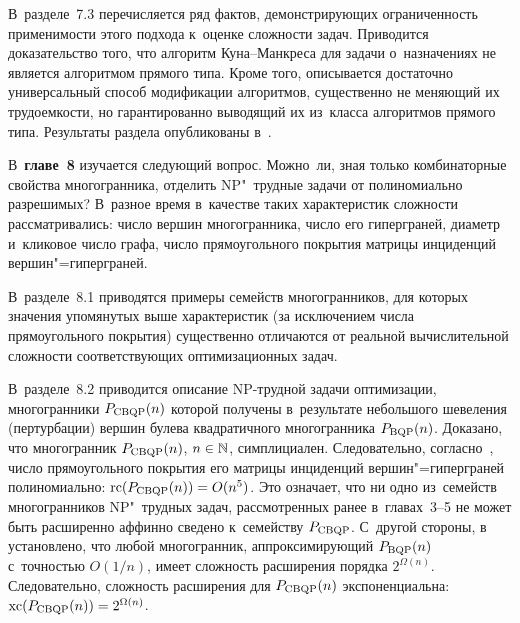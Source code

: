 В~разделе~7.3 перечисляется ряд фактов, демонстрирующих ограниченность применимости этого подхода к~оценке сложности задач.
Приводится доказательство того, что алгоритм Куна--Манкреса для задачи о~назначениях не является алгоритмом прямого типа.
Кроме того, описывается достаточно универсальный способ модификации алгоритмов,
существенно не меняющий их трудоемкости, но гарантированно выводящий их из~класса алгоритмов прямого типа. Результаты раздела опубликованы в~.


В~\textbf{главе~8} изучается следующий вопрос.
Можно~ли, зная только комбинаторные свойства 
многогранника, отделить NP"~трудные задачи от полиномиально разрешимых?
В~разное время в~качестве таких характеристик сложности рассматривались: число вершин многогранника, число его гиперграней, диаметр и~кликовое число графа, число прямоугольного покрытия матрицы инциденций вершин"=гиперграней.

В~разделе~8.1 приводятся примеры семейств многогранников, для которых значения упомянутых выше характеристик (за исключением числа прямоугольного покрытия) существенно отличаются от %
реальной вычислительной сложности соответствующих оптимизационных задач.

В~разделе~8.2 приводится описание NP-трудной задачи оптимизации, многогранники $P_{\textup{CBQP}}(n)$ которой получены в~результате небольшого шевеления (пертурбации) вершин булева квадратичного многогранника $P_{\textup{BQP}}(n)$. Доказано, что многогранник $P_{\textup{CBQP}}(n)$, $n \in \mathbb{N}$, симплициален. Следовательно, согласно~\cite{FioriniKPT:13}, число прямоугольного покрытия его матрицы инциденций вершин"=гиперграней полиномиально: $\operatorname{rc}(P_{\textup{CBQP}}(n)) = O(n^5)$. 
Это означает, что ни одно из~семейств многогранников NP"~трудных задач, рассмотренных ранее в~главах~3--5
не может быть расширенно аффинно сведено к~семейству $P_{\textup{CBQP}}$.
С~другой стороны, в~\cite[Theorem~4]{Braun:2015} установлено, что любой многогранник, аппроксимирующий $P_{\textup{BQP}}(n)$ с~точностью $O(1/n)$, имеет сложность расширения порядка $2^{\Omega(n)}$.
Следовательно, сложность расширения для $P_{\textup{CBQP}}(n)$ экспоненциальна: $\operatorname{xc}(P_{\textup{CBQP}}(n)) = 2^{\Omega(n)}$.

